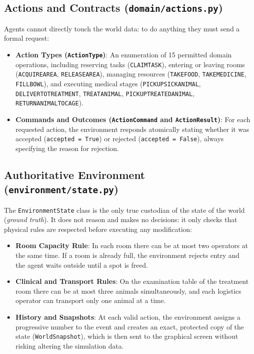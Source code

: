\documentclass{article}
\renewcommand{\_}{\oldtextunderscore\allowbreak}
\begin{document}
\subsection{Actions and Contracts (\texttt{domain/actions.py})}
Agents cannot directly touch the world data: to do anything they must send a formal request:
\begin{itemize}
    \item \textbf{Action Types (\texttt{ActionType})}: An enumeration of 15 permitted domain operations, including reserving tasks (\texttt{CLAIM\_TASK}), entering or leaving rooms (\texttt{ACQUIRE\_AREA}, \texttt{RELEASE\_AREA}), managing resources (\texttt{TAKE\_FOOD}, \texttt{TAKE\_MEDICINE}, \texttt{FILL\_BOWL}), and executing medical stages (\texttt{PICKUP\_SICK\_ANIMAL}, \texttt{DELIVER\_TO\_TREATMENT}, \texttt{TREAT\_ANIMAL}, \texttt{PICKUP\_TREATED\_ANIMAL}, \texttt{RETURN\_ANIMAL\_TO\_CAGE}).
    \item \textbf{Commands and Outcomes (\texttt{ActionCommand} and \texttt{ActionResult})}: For each requested action, the environment responds atomically stating whether it was accepted (\texttt{accepted = True}) or rejected (\texttt{accepted = False}), always specifying the reason for rejection.
\end{itemize}
\subsection{Authoritative Environment (\texttt{environment/state.py})}
The \texttt{EnvironmentState} class is the only true custodian of the state of the world (\textit{ground truth}). It does not reason and makes no decisions: it only checks that physical rules are respected before executing any modification:
\begin{itemize}
    \item \textbf{Room Capacity Rule}: In each room there can be at most two operators at the same time. If a room is already full, the environment rejects entry and the agent waits outside until a spot is freed.
    \item \textbf{Clinical and Transport Rules}: On the examination table of the treatment room there can be at most three animals simultaneously, and each logistics operator can transport only one animal at a time.
    \item \textbf{History and Snapshots}: At each valid action, the environment assigns a progressive number to the event and creates an exact, protected copy of the state (\texttt{WorldSnapshot}), which is then sent to the graphical screen without risking altering the simulation data.
\end{itemize}
\end{document}
